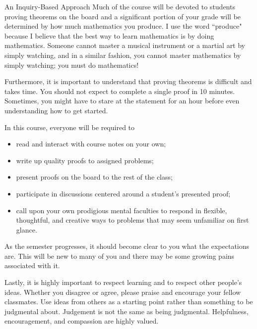 \begin{section}{An Inquiry-Based Approach}
Much of the course will be devoted to students proving theorems on the board and a significant portion of your grade will be determined by how much mathematics you produce. I use the word ``produce" because I believe that the best way to learn mathematics is by doing mathematics. Someone cannot master a musical instrument or a martial art by simply watching, and in a similar fashion, you cannot master mathematics by simply watching; you must do mathematics!

Furthermore, it is important to understand that proving theorems is difficult and takes time. You should not expect to complete a single proof in 10 minutes. Sometimes, you might have to stare at the statement for an hour before even understanding how to get started. 

In this course, everyone will be required to
\begin{itemize}
\item read and interact with course notes on your own;
\item write up quality proofs to assigned problems;
\item present proofs on the board to the rest of the class;
\item participate in discussions centered around a student's presented proof;
\item call upon your own prodigious mental faculties to respond in flexible, thoughtful, and creative ways to problems that may seem unfamiliar on first glance.
\end{itemize}
\noindent As the semester progresses, it should become clear to you what the expectations are. This will be new to many of you and there may be some growing pains associated with it.

Lastly, it is highly important to respect learning and to respect other people's ideas.  Whether you disagree or agree, please praise and encourage your fellow classmates.  Use ideas from others as a starting point rather than something to be judgmental about.  Judgement is not the same as being judgmental.  Helpfulness, encouragement, and compassion are highly valued.

\end{section}

